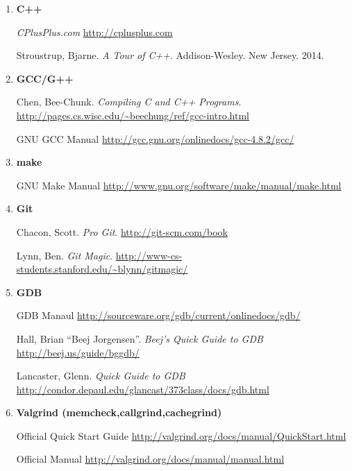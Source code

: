 \documentclass[10pt]{article}
\begin{document}
\begin{enumerate}
\begin{itemize}
\end{itemize}

\item \textbf{C++}

\textit{CPlusPlus.com} 
\newline \url{http://cplusplus.com}
\vspace{.25in}

Stroustrup, Bjarne. \textit{A Tour of C++}. Addison-Wesley. New Jersey. 2014.  
\vspace{.25in}

\item \textbf{GCC/G++}

Chen, Bee-Chunk. \textit{Compiling C and C++ Programs}.
\newline \url{http://pages.cs.wisc.edu/~beechung/ref/gcc-intro.html}
\vspace{.25in}

GNU GCC Manual \newline
\url{http://gcc.gnu.org/onlinedocs/gcc-4.8.2/gcc/}
\vspace{.25in}

\item \textbf{make}

GNU Make Manual \newline
\url{http://www.gnu.org/software/make/manual/make.html}
\vspace{.25in}

\item \textbf{Git}

Chacon, Scott. \textit{Pro Git}. \url{http://git-scm.com/book}
\vspace{.25in}

Lynn, Ben. \textit{Git Magic}. \url{http://www-cs-students.stanford.edu/~blynn/gitmagic/}
\vspace{.25in}

\item \textbf{GDB}

GDB Manaul \newline
\url{http://sourceware.org/gdb/current/onlinedocs/gdb/}
\vspace{.25in}

Hall, Brian ``Beej Jorgensen''. \textit{Beej's Quick Guide to GDB} \newline
\url{http://beej.us/guide/bggdb/}
\vspace{.25in}

Lancaster, Glenn. \textit{Quick Guide to GDB} \newline
\url{http://condor.depaul.edu/glancast/373class/docs/gdb.html}
\vspace{.25in}

\item \textbf{Valgrind (memcheck,callgrind,cachegrind)}

Official Quick Start Guide \newline
\url{http://valgrind.org/docs/manual/QuickStart.html}
\vspace{.25in}

Official Manual \newline
\url{http://valgrind.org/docs/manual/manual.html}

\end{enumerate}
\end{document}
